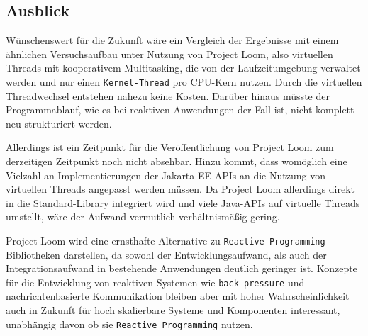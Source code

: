 \subsection{Ausblick}
\label{subsec:ausblick}
Wünschenswert für die Zukunft wäre ein Vergleich der Ergebnisse mit einem ähnlichen Versuchsaufbau unter Nutzung von Project Loom,
also virtuellen Threads mit kooperativem Multitasking, die von der Laufzeitumgebung verwaltet werden und nur einen \verb|Kernel-Thread| pro CPU-Kern nutzen.
Durch die virtuellen Threadwechsel entstehen nahezu keine Kosten. Darüber hinaus müsste der Programmablauf, wie es bei reaktiven Anwendungen
der Fall ist, nicht komplett neu strukturiert werden.

Allerdings ist ein Zeitpunkt für die Veröffentlichung von Project Loom zum derzeitigen Zeitpunkt noch nicht absehbar.
Hinzu kommt, dass womöglich eine Vielzahl an Implementierungen der Jakarta EE-APIs an die Nutzung von virtuellen Threads angepasst werden müssen.
Da Project Loom allerdings direkt in die Standard-Library
integriert wird und viele Java-APIs auf virtuelle Threads umstellt, wäre der Aufwand vermutlich verhältnismäßig gering.

Project Loom wird eine ernsthafte Alternative zu \verb|Reactive Programming|-Bibliotheken darstellen, da sowohl der Entwicklungsaufwand, als auch
der Integrationsaufwand in bestehende Anwendungen deutlich geringer ist.
Konzepte für die Entwicklung von reaktiven Systemen wie \verb|back-pressure| und nachrichtenbasierte Kommunikation bleiben aber mit hoher
Wahrscheinlichkeit auch in Zukunft für hoch skalierbare Systeme und Komponenten interessant, unabhängig davon ob sie \verb|Reactive Programming| nutzen.